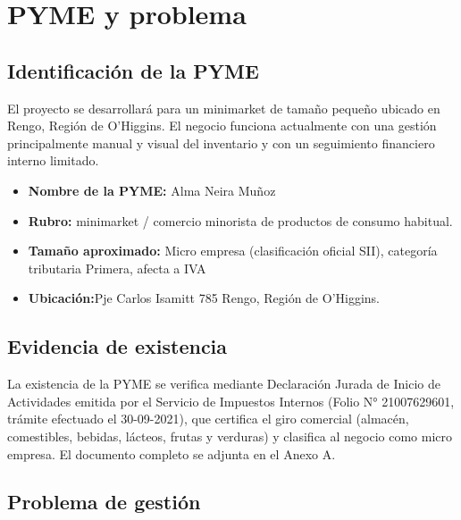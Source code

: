 \documentclass[10pt,a4paper]{article}
\begin{document}


\tableofcontents
\newpage
{}



\section{PYME y problema}

\subsection{Identificación de la PYME}

El proyecto se desarrollará para un minimarket de tamaño pequeño ubicado en Rengo, Región de O'Higgins. El negocio funciona actualmente con una gestión principalmente manual y visual del inventario y con un seguimiento financiero interno limitado.

\begin{itemize}[leftmargin=*]
    \item \textbf{Nombre de la PYME:} Alma Neira Muñoz
    \item \textbf{Rubro:} minimarket / comercio minorista de productos de consumo habitual.
    \item \textbf{Tamaño aproximado:} {Micro empresa (clasificación oficial SII), categoría tributaria Primera, afecta a IVA}
    \item \textbf{Ubicación:}Pje Carlos Isamitt 785 Rengo, Región de O'Higgins.
\end{itemize}

\subsection{Evidencia de existencia}

{La existencia de la PYME se verifica mediante Declaración Jurada de Inicio de Actividades emitida por el Servicio de Impuestos Internos (Folio N° 21007629601, trámite efectuado el 30-09-2021), que certifica el giro comercial (almacén, comestibles, bebidas, lácteos, frutas y verduras) y clasifica al negocio como micro empresa. El documento completo se adjunta en el Anexo A.}

\subsection{Problema de gestión}
\end{document}
